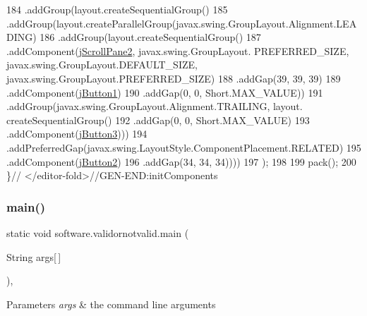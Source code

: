 \begin{DoxyCode}
184                     .addGroup(layout.createSequentialGroup()
185                         .addGroup(layout.createParallelGroup(javax.swing.GroupLayout.Alignment.LEADING)
186                             .addGroup(layout.createSequentialGroup()
187                                 .addComponent(\mbox{\hyperlink{classsoftware_1_1validornotvalid_afbe433c154dcca4c8d5a9c0714485d8e}{jScrollPane2}}, javax.swing.GroupLayout.
      PREFERRED\_SIZE, javax.swing.GroupLayout.DEFAULT\_SIZE, javax.swing.GroupLayout.PREFERRED\_SIZE)
188                                 .addGap(39, 39, 39)
189                                 .addComponent(\mbox{\hyperlink{classsoftware_1_1validornotvalid_a4322ace1270f409aa8ada36dd8fde2e5}{jButton1}})
190                                 .addGap(0, 0, Short.MAX\_VALUE))
191                             .addGroup(javax.swing.GroupLayout.Alignment.TRAILING, layout.
      createSequentialGroup()
192                                 .addGap(0, 0, Short.MAX\_VALUE)
193                                 .addComponent(\mbox{\hyperlink{classsoftware_1_1validornotvalid_ab48fb28356cce2216dcac1cb0131624c}{jButton3}})))
194                         .addPreferredGap(javax.swing.LayoutStyle.ComponentPlacement.RELATED)
195                         .addComponent(\mbox{\hyperlink{classsoftware_1_1validornotvalid_a18b41fd0e21eac702ca4a03b9a10285b}{jButton2}})
196                         .addGap(34, 34, 34))))
197         );
198 
199         pack();
200     \}\textcolor{comment}{// </editor-fold>//GEN-END:initComponents}
\end{DoxyCode}
\mbox{\label{classsoftware_1_1validornotvalid_a0470609728096a74f5c382a5ec31ab58}} 
\subsubsection{\texorpdfstring{main()}{main()}}
{\footnotesize\ttfamily static void software.\+validornotvalid.\+main (\begin{DoxyParamCaption}\item[{String}]{args\mbox{[}$\,$\mbox{]} }\end{DoxyParamCaption})\hspace{0.3cm}{\ttfamily [inline]}, {\ttfamily [static]}}


\begin{DoxyParams}{Parameters}
{\em args} & the command line arguments \\
\hline
\end{DoxyParams}

